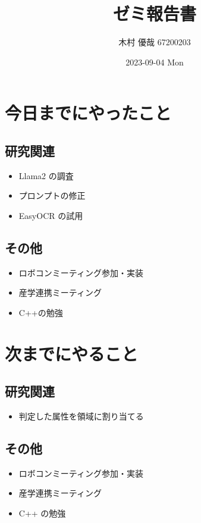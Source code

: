 \documentclass[uplatex, onecolumn, 10pt]{jsarticle}
\begin{document}
\title{\vspace{-40mm}\bf{\LARGE{ゼミ報告書}}}
\author{\vspace{-40mm}木村 優哉 67200203}
\date{2023-09-04 Mon}
\maketitle


\section{今日までにやったこと}

\subsection*{研究関連}
\begin{itemize}
	\item Llama2 の調査
	\item プロンプトの修正
	\item EasyOCR の試用
\end{itemize}

\subsection*{その他}
\begin{itemize}
	\item ロボコンミーティング参加・実装
	\item 産学連携ミーティング
	\item C++の勉強
\end{itemize}


\section{次までにやること}

\subsection*{研究関連}
\begin{itemize}
	\item 判定した属性を領域に割り当てる
\end{itemize}

\subsection*{その他}
\begin{itemize}
	\item ロボコンミーティング参加・実装
	\item 産学連携ミーティング
	\item C++ の勉強
\end{itemize}
\end{document}
